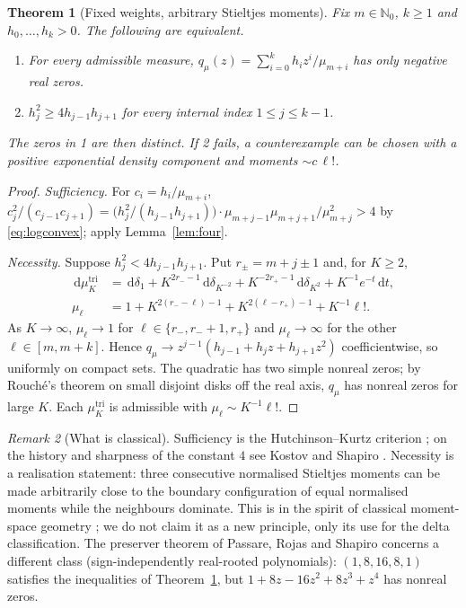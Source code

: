 \documentclass[11pt,a4paper]{article}
\newtheorem{theorem}{Theorem}[section]
\theoremstyle{definition}
\theoremstyle{remark}
\newtheorem{remark}[theorem]{Remark}
\newcommand{\dd}{\,\mathrm{d}}
\newcommand{\Nzero}{\mathbb{N}_0}
\begin{document}
\begin{theorem}[Fixed weights, arbitrary Stieltjes moments]\label{thm:universalcoefficients}
Fix $m\in\Nzero$, $k\ge1$ and $h_0,\dots,h_k>0$. The following are equivalent.
\begin{enumerate}
\item For every admissible measure, $q_{\mu}(z)=\sum_{i=0}^kh_iz^i/\mu_{m+i}$
has only negative real zeros.
\item $h_j^2\ge4h_{j-1}h_{j+1}$ for every internal index $1\le j\le k-1$.
\end{enumerate}
The zeros in 1 are then distinct. If 2 fails, a counterexample can be
chosen with a positive exponential density component and moments
$\sim c\,\ell!$.
\end{theorem}
\begin{proof}
\emph{Sufficiency.} For $c_i=h_i/\mu_{m+i}$,
$c_j^2/(c_{j-1}c_{j+1})=\bigl(h_j^2/(h_{j-1}h_{j+1})\bigr)\cdot
\mu_{m+j-1}\mu_{m+j+1}/\mu_{m+j}^2>4$ by \eqref{eq:logconvex}; apply
Lemma~\ref{lem:four}.

\emph{Necessity.} Suppose $h_j^2<4h_{j-1}h_{j+1}$. Put $r_\pm=m+j\pm1$ and,
for $K\ge2$,
\begin{equation}\label{eq:triplemeasure}
 \begin{aligned}
 \dd\mu^{\mathrm{tri}}_K&=\dd\delta_1+K^{2r_--1}\dd\delta_{K^{-2}}
 +K^{-2r_+-1}\dd\delta_{K^2}+K^{-1}e^{-t}\dd t,\\
 \mu_\ell&=1+K^{2(r_--\ell)-1}+K^{2(\ell-r_+)-1}+K^{-1}\ell! .
 \end{aligned}
\end{equation}
As $K\to\infty$, $\mu_\ell\to1$ for $\ell\in\{r_-,r_-+1,r_+\}$ and
$\mu_\ell\to\infty$ for the other $\ell\in[m,m+k]$. Hence $q_\mu\to
z^{j-1}(h_{j-1}+h_jz+h_{j+1}z^2)$ coefficientwise, so uniformly on
compact sets. The quadratic has two simple nonreal zeros; by Rouché's
theorem on small disjoint disks off the real axis, $q_\mu$ has nonreal
zeros for large $K$. Each $\mu^{\mathrm{tri}}_K$ is admissible with
$\mu_\ell\sim K^{-1}\ell!$.
\end{proof}

\begin{remark}[What is classical]\label{rem:classical}
Sufficiency is the Hutchinson--Kurtz criterion
\cite{Hutchinson1923,Kurtz1992}; on the history and sharpness of the
constant $4$ see Kostov and Shapiro \cite{KostovShapiro2013}. Necessity is
a realisation statement: three consecutive normalised Stieltjes moments
can be made arbitrarily close to the boundary configuration of equal
normalised moments while the neighbours dominate. This is in the spirit of classical moment-space
geometry \cite{Schmudgen2017}; we do not claim it as a new principle,
only its use for the delta classification. The preserver theorem of
Passare, Rojas and Shapiro \cite{Passare2011} concerns a different class
(sign-independently real-rooted polynomials): $(1,8,16,8,1)$ satisfies the
inequalities of Theorem~\ref{thm:universalcoefficients}, but
$1+8z-16z^2+8z^3+z^4$ has nonreal zeros.
\end{remark}
\end{document}
